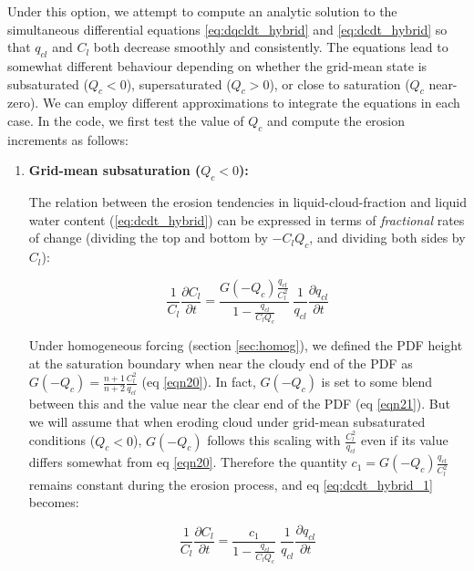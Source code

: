 \documentclass{UMDP_article}
\begin{document}
\begin{enumerate}
\begin{itemize}
\end{itemize}

Under this option, we attempt to compute an analytic solution to the
simultaneous differential equations \ref{eq:dqcldt_hybrid} and
\ref{eq:dcdt_hybrid} so that $q_{cl}$ and $C_l$ both decrease smoothly and
consistently.
The equations lead to somewhat different behaviour depending on whether
the grid-mean state is subsaturated ($Q_c < 0$), supersaturated ($Q_c > 0$),
or close to saturation ($Q_c$ near-zero).  We can employ different
approximations to integrate the equations in each case.
In the code, we first test the value of $Q_c$ and compute the erosion
increments as follows:

\begin{enumerate}

\item {\bf Grid-mean subsaturation ($Q_c < 0$):}

The relation between the erosion tendencies in liquid-cloud-fraction and
liquid water content (\ref{eq:dcdt_hybrid}) can be expressed in terms of
{\em fractional} rates of change
(dividing the top and bottom by $-C_l Q_c$, and dividing both sides by $C_l$):

\begin{equation}
\frac{1}{C_l} \frac{\partial C_l}{\partial t}
 = \frac{ G(-Q_c) \frac{q_{cl}}{C_l^2} }{ 1 - \frac{q_{cl}}{C_l Q_c} } \;
   \frac{1}{q_{cl}} \frac{\partial q_{cl}}{\partial t}
\label{eq:dcdt_hybrid_1}
\end{equation}

Under homogeneous forcing (section \ref{sec:homog}), we defined the PDF height
at the saturation boundary when near the cloudy end of the PDF as
$G(-Q_c) = \frac{n+1}{n+2} \frac{C_l^2}{q_{cl}}$ (eq \ref{eqn20}).
In fact, $G(-Q_c)$ is set to some blend between this and the value near
the clear end of the PDF (eq \ref{eqn21}).  But we will assume that
when eroding cloud under grid-mean subsaturated conditions ($Q_c < 0$),
$G(-Q_c)$ follows this scaling with $\frac{C_l^2}{q_{cl}}$ even if its
value differs somewhat from eq \ref{eqn20}.
Therefore the quantity $c_1 = G(-Q_c) \frac{q_{cl}}{C_l^2}$ remains constant
during the erosion process, and eq \ref{eq:dcdt_hybrid_1} becomes:

\begin{equation}
\frac{1}{C_l} \frac{\partial C_l}{\partial t}
 = \frac{ c_1 }{ 1 - \frac{q_{cl}}{C_l Q_c} } \;
   \frac{1}{q_{cl}} \frac{\partial q_{cl}}{\partial t}
\label{eq:dcdt_hybrid_2}
\end{equation}


\end{enumerate}
\end{enumerate}
\end{document}

